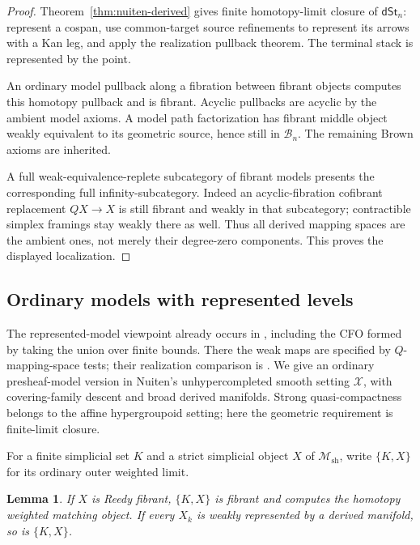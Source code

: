 \documentclass[12pt]{amsart}
\newtheorem{lem}[thm]{Lemma}
\theoremstyle{definition}
\theoremstyle{remark}
\numberwithin{equation}{section}
\newcommand{\CM}{\mathcal M}
\newcommand{\dSt}{\mathsf{dSt}}
\begin{document}
\begin{proof}
Theorem~\ref{thm:nuiten-derived} gives finite homotopy-limit
closure of $\dSt_n$: represent a cospan, use common-target
source refinements to represent its arrows with a Kan leg,
and apply the realization pullback theorem.
The terminal stack is represented by the point.

An ordinary model pullback along a fibration between fibrant
objects computes this homotopy pullback and is fibrant.
Acyclic pullbacks are acyclic by the ambient model axioms.
A model path factorization has fibrant middle object weakly
equivalent to its geometric source, hence still in $\mathcal B_n$.
The remaining Brown axioms are inherited.

A full weak-equivalence-replete subcategory of fibrant models
presents the corresponding full infinity-subcategory.
Indeed an acyclic-fibration cofibrant replacement $QX\to X$
is still fibrant and weakly in that subcategory; contractible
simplex framings stay weakly there as well. Thus all derived
mapping spaces are the ambient ones, not merely their
degree-zero components. This proves the displayed localization.
\end{proof}

\subsection{Ordinary models with represented levels}

The represented-model viewpoint already occurs in
\cite[Definitions~3.1--3.2, Remark~3.3, Lemma~3.4 and
Remark~3.28, pp.~16--21]{Pridham2013}, including the CFO formed by taking the
union over finite bounds.
There the weak maps are specified by $Q$-mapping-space tests;
their realization comparison is
\cite[Theorem~4.10, p.~26]{Pridham2013}.
We give an ordinary presheaf-model version in Nuiten's
unhypercompleted smooth setting $\mathcal X$, with
covering-family descent and broad derived manifolds.
Strong quasi-compactness belongs to the affine hypergroupoid
setting; here the geometric requirement is finite-limit closure.

For a finite simplicial set $K$ and a strict simplicial object
$X$ of $\CM_{\mathrm{sh}}$, write $\{K,X\}$ for its ordinary
outer weighted limit.

\begin{lem}\label{lem:derived-weighted-matching}
If $X$ is Reedy fibrant, $\{K,X\}$ is fibrant and computes
the homotopy weighted matching object. If every $X_k$ is
weakly represented by a derived manifold, so is $\{K,X\}$.
\end{lem}
\end{document}
